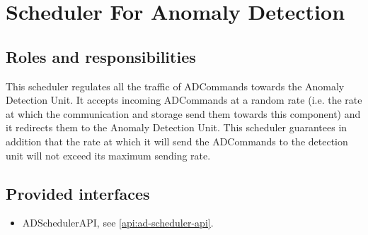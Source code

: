 \section{Scheduler For Anomaly Detection}
\label{element:scheduler-ad}

\subsection{Roles and responsibilities}

\npar This scheduler regulates all the traffic of ADCommands towards the
Anomaly Detection Unit. It accepts incoming ADCommands at a random rate (i.e.
the rate at which the communication and storage send them towards this
component) and it redirects them to the Anomaly Detection Unit. This
scheduler guarantees in addition that the rate at which it will send the
ADCommands to the detection unit will not exceed its maximum sending rate.

\subsection{Provided interfaces}

\begin{itemize}
  \item ADSchedulerAPI, see \ref{api:ad-scheduler-api}.
\end{itemize}



